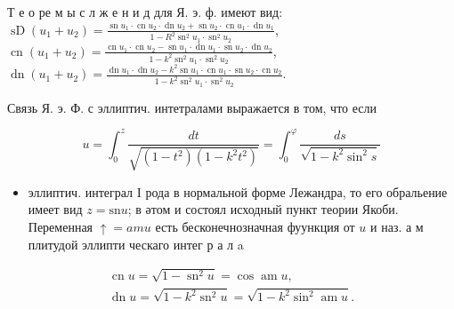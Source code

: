 \documentclass[10pt]{article}
\begin{document}
Т е о ре м ы с л ж е н и д для Я. э. ф. имеют вид: $\operatorname{sD}\left(u_{1}+u_{2}\right)=\frac{\operatorname{sn} u_{1} \cdot \operatorname{cn} u_{2} \cdot \operatorname{dn} u_{2}+\operatorname{sn} u_{2} \cdot \operatorname{cn} u_{1} \cdot \operatorname{dn} u_{1}}{1-R^{2} \operatorname{sn}^{2} u_{1} \cdot \operatorname{sn}^{2} u_{2}}$, $\operatorname{cn}\left(u_{1}+u_{2}\right)=\frac{\operatorname{cn} u_{1} \cdot \operatorname{cn} u_{2}-\operatorname{sn} u_{1} \cdot \operatorname{dn} u_{1} \cdot \operatorname{sn} u_{2} \cdot \operatorname{dn} u_{2}}{1-k^{2} \operatorname{sn}^{2} u_{1} \cdot \operatorname{sn}^{2} u_{2}}$, $\operatorname{dn}\left(u_{1}+u_{2}\right)=\frac{\operatorname{dn} u_{1} \cdot \operatorname{dn} u_{2}-k^{2} \operatorname{sn} u_{1} \cdot \operatorname{cn} u_{1} \cdot \operatorname{sn} u_{2} \cdot \operatorname{cn} u_{2}}{1-k^{2} \operatorname{sn}^{2} u_{1} \cdot \operatorname{sn}^{2} u_{2}}$.



Связь Я. э. Ф. с эллиптич. интетралами выражается в том, что если



\[

u=\int_{0}^{z} \frac{d t}{\sqrt{\left(1-t^{2}\right)\left(1-k^{2} t^{2}\right)}}=\int_{0}^{\varphi} \frac{d s}{\sqrt{1-k^{2} \sin ^{2} s}}

\]



\begin{itemize}

  \item эллиптич. интеграл I рода в нормальной форме Лежандра, то его обральение имеет вид $z=\mathrm{sn} u$; в әтом и состоял исходный пункт теории Якоби. Переменная $\uparrow=a m u$ есть бесконечнозначная фуункция от $u$ и наз. а м плитудой эллипти ческаго интег р а л a

\end{itemize}



\[

\begin{gathered}

\operatorname{cn} u=\sqrt{1-\operatorname{sn}^{2} u}=\cos \operatorname{am} u, \\

\operatorname{dn} u=\sqrt{1-k^{2} \operatorname{sn}^{2} u}=\sqrt{1-k^{2} \sin ^{2} \operatorname{am} u} .

\end{gathered}

\]
\end{document}
